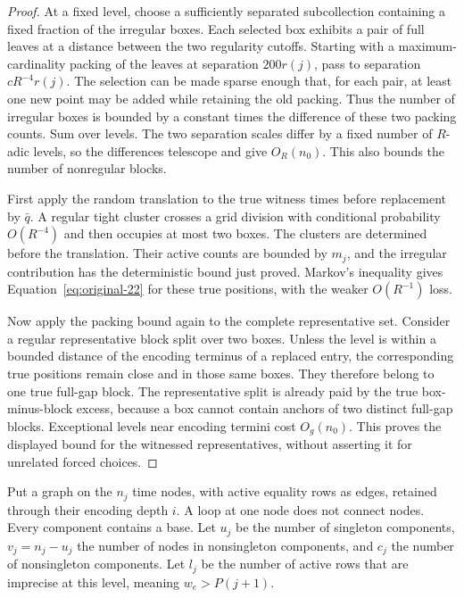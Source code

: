 \begin{proof}
At a fixed level, choose a sufficiently separated subcollection
containing a fixed fraction of the irregular boxes.  Each selected
box exhibits a pair of full leaves at a distance between the two
regularity cutoffs.  Starting with a maximum-cardinality packing of
the leaves at separation $200r(j)$, pass to separation
$cR^{-4}r(j)$.  The selection can be made sparse enough that, for
each pair, at least one new point may be added while retaining the
old packing.  Thus the number of irregular boxes is bounded by a
constant times the difference of these two packing counts.  Sum over
levels.  The two separation scales differ by a fixed number of
$R$-adic levels, so the differences telescope and give $O_R(n_0)$.
This also bounds the number of nonregular blocks.

First apply the random translation to the true witness times before
replacement by $\bar q$.  A regular tight cluster crosses a grid
division with conditional probability $O(R^{-4})$ and then occupies
at most two boxes.  The clusters are determined before the
translation.  Their active counts are bounded by $m_j$, and the
irregular contribution has the deterministic bound just proved.
Markov's inequality gives Equation~\eqref{eq:original-22} for these
true positions, with the weaker $O(R^{-1})$ loss.

Now apply the packing bound again to the complete representative set.
Consider a regular representative block split over two boxes.  Unless
the level is within a bounded distance of the encoding terminus of
a replaced entry, the corresponding true positions remain close and
in those same boxes.  They therefore belong to one true full-gap
block.  The representative split is already paid by the true
box-minus-block excess, because a box cannot contain anchors of two
distinct full-gap blocks.  Exceptional levels near encoding termini
cost $O_g(n_0)$.  This proves the displayed bound for the witnessed
representatives, without asserting it for unrelated forced choices.
\end{proof}

Put a graph on the $n_j$ time nodes, with active equality rows as
edges, retained through their encoding depth $i$.  A loop at one
node does not connect nodes.  Every component contains a base.
Let $u_j$ be the number of singleton components, $v_j=n_j-u_j$
the number of nodes in nonsingleton components, and $c_j$ the number
of nonsingleton components.  Let $l_j$ be the number of active rows
that are imprecise at this level, meaning $w_e>P(j+1)$.

